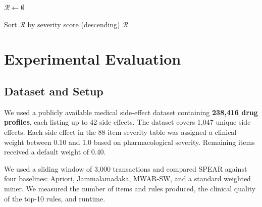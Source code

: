 \documentclass[10pt,twocolumn]{article}
\begin{document}
\begin{algorithm}[H]
\caption{SPEAR: Unified Positive-Negative Mining}
\label{alg:spear}
\small
{}


$\mathcal{R} \leftarrow \emptyset$\;

Sort $\mathcal{R}$ by severity score (descending)\;
\Return $\mathcal{R}$\;
\end{algorithm}

\section{Experimental Evaluation}
\label{sec:experiments}

\subsection{Dataset and Setup}

We used a publicly available medical side-effect dataset containing
\textbf{238{,}416 drug profiles}, each listing up to 42 side effects.
The dataset covers 1{,}047 unique side effects. Each side effect in
the 88-item severity table was assigned a clinical weight between
0.10 and 1.0 based on pharmacological severity. Remaining items
received a default weight of 0.40.

We used a sliding window of 3{,}000 transactions and compared SPEAR
against four baselines: Apriori, Jammalamadaka, MWAR-SW, and a
standard weighted miner. We measured the number of items and rules
produced, the clinical quality of the top-10 rules, and runtime.
\end{document}
